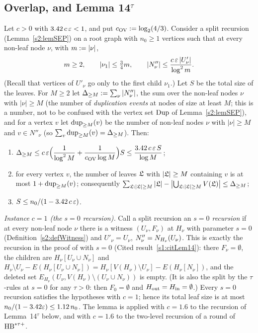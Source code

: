 \subsection{Overlap, and Lemma 14\texorpdfstring{$^\tau$}{-tau}}

\begin{lemma}\label{s2:lemOVgeneric}
Let $c>0$ with $3.42\,c\,\varepsilon<1$, and put $c_{\mathrm{OV}}\mathrel{:=}\log_2(4/3)$. Consider a
split recursion (Lemma~\ref{s2:lemSEP}) on a root graph with $n_0\ge1$
vertices such that at every non-leaf node $\nu$, with $m\mathrel{:=}|\nu|$,
\[
m\ge2,\qquad |\nu_1|\le\tfrac34m,\qquad
|N''_\nu|\le\frac{c\,\varepsilon\,|U'_\nu|}{\log^2m}.
\]
(Recall that vertices of $U'_\nu$ go only to the first child $\nu_1$.) Let $S$
be the total size of the leaves. For $M\ge2$ let
$\Delta_{\ge M}\mathrel{:=}\sum_\nu|N''_\nu|$, the sum over the non-leaf nodes $\nu$
with $|\nu|\ge M$ (the number of \emph{duplication events} at nodes of size at
least $M$; this is a number, not to be confused with the vertex set $\mathrm{Dup}$ of
Lemma~\ref{s2:lemSEP}), and for a vertex $v$ let $\mathrm{dup}_{\ge M}(v)$ be the number of
non-leaf nodes $\nu$ with $|\nu|\ge M$ and $v\in N''_\nu$ (so
$\sum_v\mathrm{dup}_{\ge M}(v)=\Delta_{\ge M}$). Then:
\begin{enumerate}
\item[(a)] $\displaystyle\Delta_{\ge M}\le
c\,\varepsilon\Bigl(\frac1{\log^2M}+\frac1{c_{\mathrm{OV}}\log M}\Bigr)S\le
\frac{3.42\,c\,\varepsilon\,S}{\log M}$;
\item[(b)] for every vertex $v$, the number of leaves $\mathfrak{L}$ with
$|\mathfrak{L}|\ge M$ containing $v$ is at most $1+\mathrm{dup}_{\ge M}(v)$; consequently
$\sum_{\mathfrak{L}:|\mathfrak{L}|\ge M}|\mathfrak{L}|-\bigl|\bigcup_{\mathfrak{L}:|\mathfrak{L}|\ge
M}V(\mathfrak{L})\bigr|\le\Delta_{\ge M}$;
\item[(c)] $S\le n_0/(1-3.42\,c\,\varepsilon)$.
\end{enumerate}
\emph{Instance $c=1$ (the $s=0$ recursion).} Call a split recursion an
\emph{$s=0$ recursion} if at every non-leaf node $\nu$ there is a witness
$(U_\nu,F_\nu)$ at $H_\nu$ with parameter $s=0$ (Definition~\ref{s2:defWitness})
and $U'_\nu=U_\nu$, $N''_\nu=N_{H_\nu}(U_\nu)$. This is exactly the
recursion in the proof of \cite[Lemma~14]{BM} with $s=0$
(Cited result~\ref{s1:citLem14}): there $F_\nu=\emptyset$, the children are
$H_\nu[U_\nu\cup N_\nu]$ and $H_\nu\setminus U_\nu-E(H_\nu[U_\nu\cup
N_\nu])=H_\nu[V(H_\nu)\setminus U_\nu]-E(H_\nu[N_\nu])$, and the deleted set
$E_{H_\nu}(U_\nu,V(H_\nu)\setminus(U_\nu\cup N_\nu))$ is empty. (It is also
the split by the $\tau$-rules at $s=0$ for any $\tau>0$: then $F_0=\emptyset$
and $H_{\mathrm{out}}=H_{\mathrm{in}}=\emptyset$.) Every $s=0$ recursion satisfies the hypotheses
with $c=1$; hence its total leaf size is at most $n_0/(1-3.42\varepsilon)\le1.12\,n_0$.
The lemma is applied with $c=1.6$ to the recursion of Lemma~14$^\tau$ below,
and with $c=1.6$ to the two-level recursion of a round of $\mathrm{HB}^{*\tau{+}}$.
\deps{\ref{s2:lemSEP}, \ref{s2:defWitness}, \ref{s1:citLem14}}
\end{lemma}

